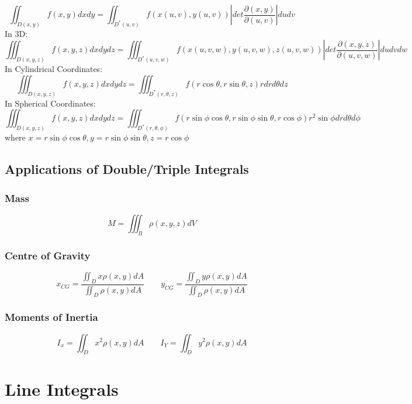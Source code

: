 \documentclass[11pt, oneside]{article}
\begin{document}
\begin{equation}
  \iint_{D(x,y)}f(x,y)dxdy = \iint_{D^*(u,v)}f(x(u,v),y(u,v))\left|det \frac{\partial(x,y)}{\partial(u,v)}\right| dudv
\end{equation}
In 3D:
\begin{equation}
  \iiint_{D(x,y,z)}f(x,y,z)dxdydz = \iiint_{D^*(u,v,w)}f(x(u,v,w),y(u,v,w),z(u,v,w))\left|det \frac{\partial(x,y,z)}{\partial(u,v,w)}\right| dudvdw
\end{equation}
In Cylindrical Coordinates:
\begin{equation}
  \iiint_{D(x,y,z)}f(x,y,z)dxdydz = \iiint_{D^*(r,\theta,z)}f(r\cos\theta,r\sin\theta,z)rdrd\theta dz
\end{equation}
In Spherical Coordinates:
\begin{equation}
  \iiint_{D(x,y,z)}f(x,y,z)dxdydz = \iiint_{D^*(r,\theta,\phi)}f(r\sin\phi\cos\theta,r\sin\phi\sin\theta,r\cos\phi)r^2\sin\phi dr d\theta d\phi
\end{equation}
where $x = r\sin\phi\cos\theta, y=r\sin\phi\sin\theta, z = r\cos\phi$

\subsection{Applications of Double/Triple Integrals}
\subsubsection{Mass}
\begin{equation}
  M = \iiint_B \rho(x,y,z) dV
\end{equation}
\subsubsection{Centre of Gravity}
\begin{equation}
  x_{CG}=\frac{\iint_D x\rho(x,y)dA}{\iint_D\rho(x,y)dA} \qquad y_{CG}=\frac{\iint_D y\rho(x,y)dA}{\iint_D \rho(x,y)dA}
\end{equation}
\subsubsection{Moments of Inertia}
\begin{equation}
  I_x = \iint_D x^2\rho(x,y)dA \qquad I_Y = \iint_D y^2 \rho(x,y)dA
\end{equation}

\section{Line Integrals}
\end{document}
